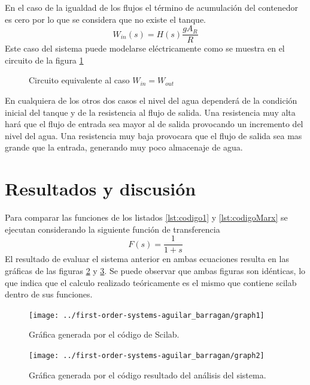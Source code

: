 \documentclass[letterpaper,11pt]{article}
\begin{document}
	En el caso de la igualdad de los flujos el término de acumulación del contenedor es cero por lo que se considera que no existe el tanque.
	\[ W_{in}(s) = H(s) \frac{gA_R}{R} \]
	Este caso del sistema puede modelarse eléctricamente como se muestra en el circuito de la figura \ref{fig:cir1}
	\begin{figure}
		\centering
		\caption{Circuito equivalente al caso $W_{in} = W_{out}$}
		\label{fig:cir1}
	\end{figure}
	En cualquiera de los otros dos casos el nivel del agua dependerá de la condición inicial del tanque y de la resistencia al flujo de salida. Una resistencia muy alta hará que el flujo de entrada sea mayor al de salida provocando un incremento del nivel del agua. Una resistencia muy baja provocara que el flujo de salida sea mas grande que la entrada, generando muy poco almacenaje de agua.
	\section{Resultados y discusión}
	Para comparar las funciones de los listados \ref{lst:codigo1} y \ref{lst:codigoMarx} se ejecutan considerando la siguiente función de transferencia
	\[ F(s) = \frac{1}{1+s}\]
	El resultado de evaluar el sistema anterior en ambas ecuaciones resulta en las gráficas de las figuras \ref{fig:graph1} y \ref{fig:graph2}. Se puede observar que ambas figuras son idénticas, lo que indica que el calculo realizado teóricamente es el mismo que contiene scilab dentro de sus funciones.
	\begin{figure}[h!]
		\centering
		\texttt{[image: ../first-order-systems-aguilar\_barragan/graph1]}
		\caption{Gráfica generada por el código de Scilab.}
		\label{fig:graph1}
	\end{figure}
		\begin{figure}[h!]
			\centering
			\texttt{[image: ../first-order-systems-aguilar\_barragan/graph2]}
			\caption{Gráfica generada por el código resultado del análisis del sistema.}
			\label{fig:graph2}
		\end{figure}
	
\end{document}
